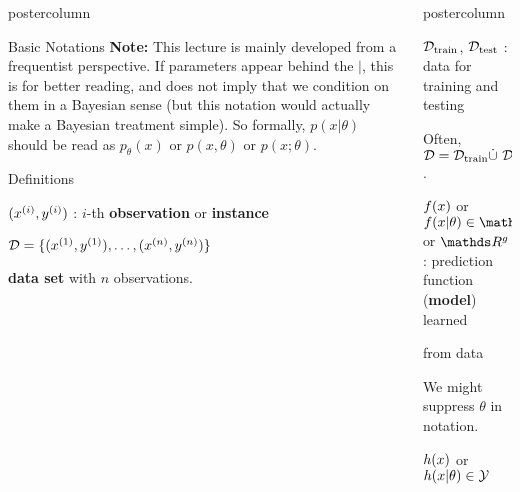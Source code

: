 \documentclass{beamer}
\newlength{\columnheight} %
\begin{document}
\begin{frame}[fragile]{}
\begin{columns}
\begin{column}{.31\textwidth}
\begin{beamercolorbox}[center]{postercolumn}
\begin{minipage}{.98\textwidth}
{\begin{myblock}{Basic Notations}
						\textbf{Note:} This lecture is mainly developed from a frequentist perspective. If parameters appear behind the $|$, this is for better reading, and does not imply that we condition on them in a Bayesian sense (but this notation would actually make a Bayesian treatment simple). So formally, $p(x | \theta)$ should be read as $p_\theta(x)$ or $p(x, \theta)$ or $p(x; \theta)$.

					\end{myblock}
					\begin{myblock}{Definitions}
						\begin{codebox}
							$(x^{(i)}, y^{(i)})$ : $i$-th \textbf{observation} or \textbf{instance}
						\end{codebox}
						\hspace*{1ex}
						\begin{codebox}
						$\mathcal{D} = \{ (x^{(1)}, y^{(1)}), \ldots, (x^{(n)}, y^{(n)})\}$
						\end{codebox}
						\hspace*{1ex}\textbf{data set} with $n$ observations.
					\end{myblock}\vfill
				}
			\end{minipage}
		\end{beamercolorbox}
	\end{column}
	\begin{column}{.31\textwidth}
		\begin{beamercolorbox}[center]{postercolumn}
			\begin{minipage}{.98\textwidth}
				\parbox[t][\columnheight]{\textwidth}{
					\begin{myblock}{}
						\begin{codebox}
							$\mathcal{D}_{\text{train}}$, $\mathcal{D}_{\text{test}}$ : data for training and testing
						\end{codebox}
						\hspace*{1ex}Often, $\mathcal{D} = \mathcal{D}_{\text{train}} \dot{\cup} ~ \mathcal{D}_{\text{test}}$.
						\\
						\begin{codebox}
							$f(x)$ or $\fxt \in \R$ or $\R^g$ : prediction function (\textbf{model}) learned
						\end{codebox}
						\begin{codebox}
						    from data
						\end{codebox}
						\hspace*{1ex}We might suppress $\theta$ in notation.
						\\
						\begin{codebox}
							 $h(x)$ or $h(x | \theta) \in \mathcal{Y}$
						\end{codebox}

\end{myblock}}
\end{minipage}
\end{beamercolorbox}
\end{column}
\end{columns}
\end{frame}
\end{document}
